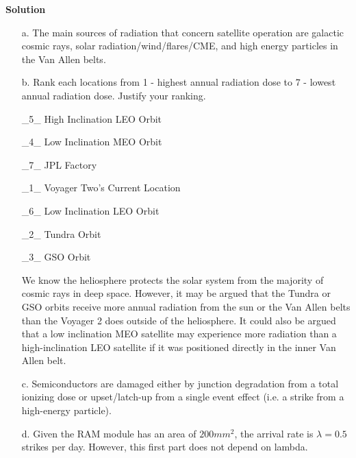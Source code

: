 \documentclass[12pt]{article}
\begin{document}
\begin{enumerate}
\begin{enumerate}
    \end{enumerate}

    \newpage

    \textbf{Solution}

    \begin{enumerate}
        \item[a.] The main sources of radiation that concern satellite operation are galactic cosmic rays, solar radiation/wind/flares/CME, 
        and high energy particles in the Van Allen belts.
        \vspace{0.5cm}

        \item[b.] Rank each locations from 1 - highest annual radiation dose to 7 - lowest annual radiation dose. Justify your ranking.
        \vspace{0.5cm}

        \_5\_ High Inclination LEO Orbit

        \_4\_ Low Inclination MEO Orbit

        \_7\_ JPL Factory

        \_1\_ Voyager Two's Current Location

        \_6\_ Low Inclination LEO Orbit

        \_2\_ Tundra Orbit

        \_3\_ GSO Orbit
        \vspace{0.5cm}

        We know the heliosphere protects the solar system from the majority of cosmic rays in deep space. However, it may be argued
        that the Tundra or GSO orbits receive more annual radiation from the sun or the Van Allen belts than the Voyager 2 does 
        outside of the heliosphere. It could also be argued that a low inclination MEO satellite may experience more radiation than
        a high-inclination LEO satellite if it was positioned directly in the inner Van Allen belt.
        \vspace{0.5cm}
        
        \item[c.] Semiconductors are damaged either by junction degradation from a total ionizing dose or upset/latch-up from a single
        event effect (i.e. a strike from a high-energy particle).

        \vspace{0.5cm}

        \item[d.] Given the RAM module has an area of $200 mm^2$, the arrival rate is $\lambda = 0.5$ strikes per day. However, this first part 
        does not depend on lambda.


\end{enumerate}
\end{enumerate}
\end{document}
